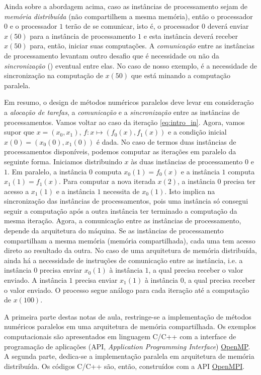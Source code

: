 Ainda sobre a abordagem acima, caso as instâncias de processamento sejam de \emph{memória distribuída} (não compartilhem a mesma memória), então o processador $0$ e o processador $1$ terão de se comunicar, isto é, o processador $0$ deverá enviar $x(50)$ para a instância de processamento $1$ e esta instância deverá receber $x(50)$ para, então, iniciar suas computações. A \emph{comunicação} entre as instâncias de processamento levantam outro desafio que é necessidade ou não da \emph{sincronização} () eventual entre elas. No caso de nosso exemplo, é a necessidade de sincronização na computação de $x(50)$ que está minando a computação paralela.

Em resumo, o design de métodos numéricos paralelos deve levar em consideração a \emph{alocação de tarefas}, a \emph{comunicação} e a \emph{sincronização} entre as instâncias de processamentos. Vamos voltar ao caso da iteração \eqref{eq:intro_in}. Agora, vamos supor que $x = (x_0, x_1)$, $f:x\mapsto (f_0(x), f_1(x))$ e a condição inicial $x(0)=(x_{0}(0), x_{1}(0))$ é dada. No caso de termos duas instâncias de processamentos disponíveis, podemos computar as iterações em paralelo da seguinte forma. Iniciamos distribuindo $x$ às duas instâncias de processamento $0$ e $1$. Em paralelo, a instância $0$ computa $x_{0}(1) = f_0(x)$ e a instância $1$ computa $x_{1}(1) = f_1(x)$. Para computar a nova iterada $x(2)$, a instância $0$ precisa ter acesso a $x_{1}(1)$ e a instância $1$ necessita de $x_{0}(1)$. Isto implica na sincronização das instâncias de processamentos, pois uma instância só consegui seguir a computação após a outra instância ter terminado a computação da mesma iteração. Agora, a comunicação entre as instâncias de processamento, depende da arquitetura do máquina. Se as instâncias de processamento compartilham a mesma memória (memória compartilhada), cada uma tem acesso direto ao resultado da outra. No caso de uma arquitetura de memória distribuída, ainda há a necessidade de instruções de comunicação entre as instância, i.e. a instância $0$ precisa enviar $x_{0}(1)$ à instância $1$, a qual precisa receber o valor enviado. A instância $1$ precisa enviar $x_{1}(1)$ à instância $0$, a qual precisa receber o valor enviado. O processo segue análogo para cada iteração até a computação de $x(100)$.

A primeira parte destas notas de aula, restringe-se a implementação de métodos numéricos paralelos em uma arquitetura de memória compartilhada. Os exemplos computacionais são apresentados em linguagem C/C++ com a interface de programação de aplicações (API, {\it Application Programming Interface}) \href{https://www.openmp.org/}{OpenMP}. A segunda parte, dedica-se a implementação paralela em arquitetura de memória distribuída. Os códigos C/C++ são, então, construídos com a API \href{https://www.open-mpi.org/}{OpenMPI}.